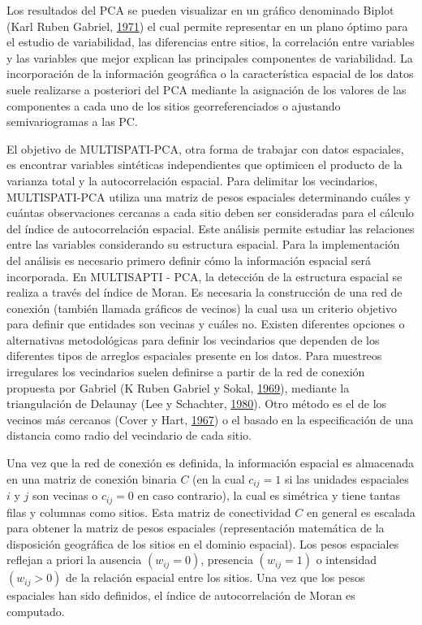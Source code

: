 \documentclass[11pt,b5paper,]{krantz}
\begin{document}
Los resultados del PCA se pueden visualizar en un gráfico denominado
Biplot (Karl Ruben Gabriel, \protect\hyperlink{ref-Gabriel_1971}{1971})
el cual permite representar en un plano óptimo para el estudio de
variabilidad, las diferencias entre sitios, la correlación entre
variables y las variables que mejor explican las principales componentes
de variabilidad. La incorporación de la información geográfica o la
característica espacial de los datos suele realizarse a posteriori del
PCA mediante la asignación de los valores de las componentes a cada uno
de los sitios georreferenciados o ajustando semivariogramas a las PC.

El objetivo de MULTISPATI-PCA, otra forma de trabajar con datos
espaciales, es encontrar variables sintéticas independientes que
optimicen el producto de la varianza total y la autocorrelación
espacial. Para delimitar los vecindarios, MULTISPATI-PCA utiliza una
matriz de pesos espaciales determinando cuáles y cuántas observaciones
cercanas a cada sitio deben ser consideradas para el cálculo del índice
de autocorrelación espacial. Este análisis permite estudiar las
relaciones entre las variables considerando su estructura espacial. Para
la implementación del análisis es necesario primero definir cómo la
información espacial será incorporada. En MULTISAPTI - PCA, la detección
de la estructura espacial se realiza a través del índice de Moran. Es
necesaria la construcción de una red de conexión (también llamada
gráficos de vecinos) la cual usa un criterio objetivo para definir que
entidades son vecinas y cuáles no. Existen diferentes opciones o
alternativas metodológicas para definir los vecindarios que dependen de
los diferentes tipos de arreglos espaciales presente en los datos. Para
muestreos irregulares los vecindarios suelen definirse a partir de la
red de conexión propuesta por Gabriel (K Ruben Gabriel y Sokal,
\protect\hyperlink{ref-Gabriel_Sokal_1969}{1969}), mediante la
triangulación de Delaunay (Lee y Schachter,
\protect\hyperlink{ref-Lee_Schachter_1980}{1980}). Otro método es el de
los vecinos más cercanos (Cover y Hart,
\protect\hyperlink{ref-Cover_Hart_1967}{1967}) o el basado en la
especificación de una distancia como radio del vecindario de cada sitio.

Una vez que la red de conexión es definida, la información espacial es
almacenada en una matriz de conexión binaria \(C\) (en la cual
\(c_{ij}=1\) si las unidades espaciales \(i\) y \(j\) son vecinas o
\(c_{ij}=0\) en caso contrario), la cual es simétrica y tiene tantas
filas y columnas como sitios. Esta matriz de conectividad \(C\) en
general es escalada para obtener la matriz de pesos espaciales
(representación matemática de la disposición geográfica de los sitios en
el dominio espacial). Los pesos espaciales reflejan a priori la ausencia
\((w_{ij}=0)\), presencia \((w_{ij}=1)\) o intensidad \((w_{ij}>0)\) de
la relación espacial entre los sitios. Una vez que los pesos espaciales
han sido definidos, el índice de autocorrelación de Moran es computado.
\end{document}
